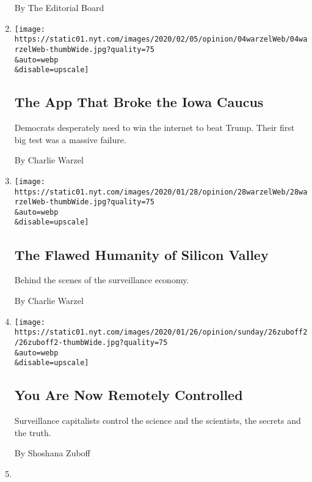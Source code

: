 \begin{enumerate}
  By The Editorial Board
\item
  \href{/2020/02/04/opinion/iowa-caucus-app.html}{}

  \texttt{[image: https://static01.nyt.com/images/2020/02/05/opinion/04warzelWeb/04warzelWeb-thumbWide.jpg?quality=75\\\&auto=webp\\\&disable=upscale]}

  \hypertarget{the-app-that-broke-the-iowa-caucus}{%
  \subsection{The App That Broke the Iowa
  Caucus}\label{the-app-that-broke-the-iowa-caucus}}

  Democrats desperately need to win the internet to beat Trump. Their
  first big test was a massive failure.

  By Charlie Warzel
\item
  \href{/2020/01/28/opinion/silicon-valley-anna-wiener.html}{}

  \texttt{[image: https://static01.nyt.com/images/2020/01/28/opinion/28warzelWeb/28warzelWeb-thumbWide.jpg?quality=75\\\&auto=webp\\\&disable=upscale]}

  \hypertarget{the-flawed-humanity-of-silicon-valley}{%
  \subsection{The Flawed Humanity of Silicon
  Valley}\label{the-flawed-humanity-of-silicon-valley}}

  Behind the scenes of the surveillance economy.

  By Charlie Warzel
\item
  \href{/2020/01/24/opinion/sunday/surveillance-capitalism.html}{}

  \texttt{[image: https://static01.nyt.com/images/2020/01/26/opinion/sunday/26zuboff2/26zuboff2-thumbWide.jpg?quality=75\\\&auto=webp\\\&disable=upscale]}

  \hypertarget{you-are-now-remotely-controlled}{%
  \subsection{You Are Now Remotely
  Controlled}\label{you-are-now-remotely-controlled}}

  Surveillance capitalists control the science and the scientists, the
  secrets and the truth.

  By Shoshana Zuboff
\item
  \href{/2020/01/24/opinion/jeff-bezos-phone-hack.html}{}


\end{enumerate}
